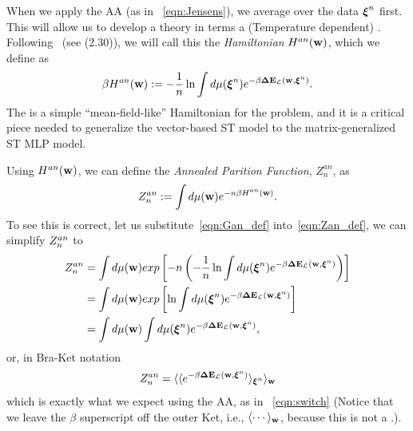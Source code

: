 When we apply the AA (as in \EQN~\ref{eqn:Jensens}), 
we average over the data $\boldsymbol{\xi}^{n}$ first. 
This will allow us to develop a theory in terms a (Temperature dependent) \EffectivePotential. 
%
Following~\cite{SST92} (see \EQN(2.30)), we will call this the \emph{\Annealed Hamiltonian} $H^{an}({\mathbf{w}})$, 
which we define as  %
  \begin{align}
   \label{eqn:Gan_def}
   \beta H^{an}({\mathbf{w}}):= - \frac{1}{n}\ln  \int d\mu(\boldsymbol{\xi}^{n})e^{-\beta\mathbf{\Delta {E}}_{\mathcal{L}}(\mathbf{w}, \boldsymbol{\xi}^{n})}.
  \end{align}
The \AnnealedHamiltonian is a simple ``mean-field-like'' Hamiltonian for the problem,
and it is a critical piece needed to generalize the vector-based ST \Perceptron model to the matrix-generalized ST MLP model.

Using $H^{an}({\mathbf{w}})$, we can define the \emph{Annealed Parition Function}, $Z^{an}_{n}$, as
\begin{align}
  \label{eqn:Zan_def}
  Z^{an}_{n} :=  \int d\mu({\mathbf{w}}) e^{-n\beta H^{an}({\mathbf{w}})}.
\end{align}
To see this is correct, let us substitute~\ref{eqn:Gan_def} into~\ref{eqn:Zan_def}, we can simplify $Z^{an}_{n}$ to
\begin{align}
  \label{eqn:Zan_simple}
  Z^{an}_{n} &=  \int d\mu({\mathbf{w}}) exp\left[-n \left(- \frac{1}{n}\ln  \int d\mu(\boldsymbol{\xi}^{n})e^{-\beta\mathbf{\Delta {E}}_{\mathcal{L}}(\mathbf{w}, \boldsymbol{\xi}^{n})}\right)\right] \\ \nonumber
  &=  \int d\mu({\mathbf{w}}) exp\left[\ln  \int d\mu(\boldsymbol{\xi}^{n})e^{-\beta\mathbf{\Delta {E}}_{\mathcal{L}}(\mathbf{w}, \boldsymbol{\xi}^{n})}\right] \\ \nonumber
  &=  \int d\mu({\mathbf{w}})  \int d\mu(\boldsymbol{\xi}^{n})e^{-\beta\mathbf{\Delta {E}}_{\mathcal{L}}(\mathbf{w}, \boldsymbol{\xi}^{n})} ,
\end{align}
or, in Bra-Ket notation
\begin{align}
  \label{eqn:Zan_brakets}
  Z^{an}_{n} = \langle\langle e^{-\beta\mathbf{\Delta {E}}_{\mathcal{L}}(\mathbf{w}, \boldsymbol{\xi}^{n})}\rangle_{\boldsymbol{\xi}^{n}}\rangle_{{\mathbf{w}}}
\end{align}
which is exactly what we expect using the AA, as in \EQN~\ref{eqn:switch}
(Notice that we leave the $\beta$ superscript off the outer Ket,
i.e., $\langle\cdots\rangle_{{\mathbf{w}}}$,  because this is not a  \ThermalAverage.).

